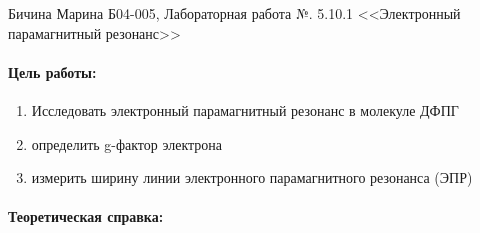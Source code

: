 \documentclass[a4paper,12pt]{article}
\author{Бичина Марина 
группа Б04-005 1 курса ФЭФМ}
\title{}
\date{}
\begin{document}

\begin{center}
\begin{Large}
{Бичина Марина Б04-005, Лабораторная работа №. 5.10.1 <<Электронный парамагнитный резонанс>>}
\end{Large}
\end{center}
\paragraph{Цель работы:} 
\begin{enumerate}
\itemsep0em
\item Исследовать электронный парамагнитный резонанс в молекуле ДФПГ
\item определить g-фактор электрона
\item измерить ширину линии электронного парамагнитного резонанса (ЭПР)
\end{enumerate}

\paragraph{Теоретическая справка:}
\end{document}

